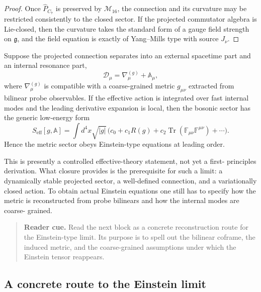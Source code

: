 \begin{proof}
Once $\hat P_{C_7}$ is preserved by $\mathcal M_{16}$, the connection and its
curvature may be restricted consistently to the closed sector.
If the projected commutator algebra is Lie-closed, then the curvature takes
the standard form of a gauge field strength on $\mathfrak g$, and the field
equation is exactly of Yang--Mills type with source $J_\nu$.
\end{proof}

\begin{proposition}
\label{prop:einstein-effective-limit}
Suppose the projected connection separates into an external spacetime part
and an internal resonance part,
\[
 \mathcal D_\mu = \nabla_\mu^{(g)} + \mathbb A_\mu,
\]
where $\nabla_\mu^{(g)}$ is compatible with a coarse-grained metric
$g_{\mu\nu}$ extracted from bilinear probe observables.
If the effective action is integrated over fast internal modes and the
leading derivative expansion is local, then the bosonic sector has the
generic low-energy form
\[
 S_{\mathrm{eff}}[g,\mathbb A]
 = \int d^4x\sqrt{|g|}\,
 \bigl(c_0 + c_1 R(g) + c_2\operatorname{Tr}(\mathbb F_{\mu\nu}\mathbb F^{\mu\nu}) + \cdots\bigr).
\]
Hence the metric sector obeys Einstein-type equations at leading order.
\end{proposition}

\begin{remark}
This is presently a controlled effective-theory statement, not yet a first-
principles derivation.
What closure provides is the prerequisite for such a limit: a dynamically
stable projected sector, a well-defined connection, and a variationally
closed action.
To obtain actual Einstein equations one still has to specify how the metric
is reconstructed from probe bilinears and how the internal modes are coarse-
grained.
\end{remark}

\begin{quote}\small
\noindent\textbf{Reader cue.} Read the next block as a concrete reconstruction route for the Einstein-type limit. Its purpose is to spell out the bilinear coframe, the induced metric, and the coarse-grained assumptions under which the Einstein tensor reappears.
\end{quote}

\subsection*{A concrete route to the Einstein limit}

